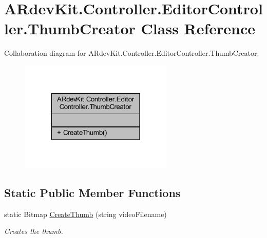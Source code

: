 \hypertarget{class_a_rdev_kit_1_1_controller_1_1_editor_controller_1_1_thumb_creator}{\section{A\-Rdev\-Kit.\-Controller.\-Editor\-Controller.\-Thumb\-Creator Class Reference}
\label{class_a_rdev_kit_1_1_controller_1_1_editor_controller_1_1_thumb_creator}
}


Collaboration diagram for A\-Rdev\-Kit.\-Controller.\-Editor\-Controller.\-Thumb\-Creator\-:
\nopagebreak
\begin{figure}[H]
\begin{center}
\leavevmode
\includegraphics[width=208pt]{class_a_rdev_kit_1_1_controller_1_1_editor_controller_1_1_thumb_creator__coll__graph}
\end{center}
\end{figure}
\subsection*{Static Public Member Functions}
\begin{DoxyCompactItemize}
\item 
static Bitmap \hyperlink{class_a_rdev_kit_1_1_controller_1_1_editor_controller_1_1_thumb_creator_a0ee173143759d30a2f48cf4a24ff6e20}{Create\-Thumb} (string video\-Filename)
\begin{DoxyCompactList}\small\item\em Creates the thumb. \end{DoxyCompactList}\end{DoxyCompactItemize}


